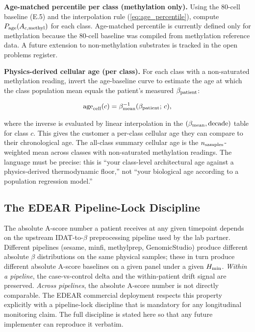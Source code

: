\documentclass[12pt,a4paper]{article}
\begin{document}
\textbf{Age-matched percentile per class (methylation only).} Using
the 80-cell baseline (E.5) and the interpolation rule
(\ref{eq:age_percentile}), compute $P_{\rm age}(A_{c,{\rm methyl}})$
for each class. Age-matched percentile is currently defined only
for methylation because the 80-cell baseline was compiled from
methylation reference data. A future extension to non-methylation
substrates is tracked in the open problems register.

\textbf{Physics-derived cellular age (per class).} For each class with
a non-saturated methylation reading, invert the age-baseline curve
to estimate the age at which the class population mean equals the
patient's measured $\beta_{\rm patient}$:

\begin{equation}
\mathrm{age}_{\rm cell}(c) = \beta_{\rm mean}^{-1}(\beta_{\rm patient};\, c),
\label{eq:cell_age}
\end{equation}

where the inverse is evaluated by linear interpolation in the
$(\beta_{\rm mean}, \mathrm{decade})$ table for class $c$. This gives
the customer a per-class cellular age they can compare to their
chronological age. The all-class summary cellular age is the
$n_{\rm samples}$-weighted mean across classes with non-saturated
methylation readings. The language must be precise: this is
``your class-level architectural age against a physics-derived
thermodynamic floor,'' not ``your biological age according to a
population regression model.''

\subsection{The EDEAR Pipeline-Lock Discipline}
\label{subsec:pipeline_lock}

The absolute A-score number a patient receives at any given timepoint
depends on the upstream IDAT-to-$\beta$ preprocessing pipeline used by
the lab partner. Different pipelines (sesame, minfi, methylprep,
GenomicStudio) produce different absolute $\beta$ distributions on the
same physical samples; these in turn produce different absolute A-score
baselines on a given panel under a given $H_{\rm min}$. \emph{Within
a pipeline}, the case-vs-control delta and the within-patient drift
signal are preserved. \emph{Across pipelines}, the absolute A-score
number is not directly comparable. The EDEAR commercial deployment
respects this property explicitly with a pipeline-lock discipline that
is mandatory for any longitudinal monitoring claim. The full discipline
is stated here so that any future implementer can reproduce it
verbatim.
\end{document}

